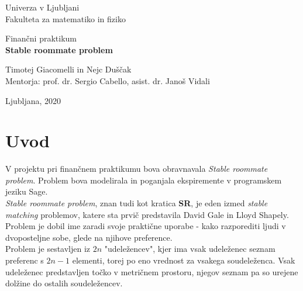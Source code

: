 \documentclass[12pt, a4paper]{article}
\begin{document}
\begin{titlepage}
\begin{center}

\large
Univerza v Ljubljani\\
\normalsize
Fakulteta za matematiko in fiziko\\

\vspace{5 cm} 

\large
Finančni praktikum \\


\vspace{0.5cm}
\LARGE
\textbf{Stable roommate problem}

\vspace{0.5 cm}

\large
Timotej Giacomelli in Nejc Duščak\\


\vspace{1.5cm}
\normalsize
Mentorja: prof. dr. Sergio Cabello, asist. dr. Janoš Vidali
\vspace{3cm}


\vfill

\large Ljubljana, 2020

\end{center}
\end{titlepage}


\newpage

\tableofcontents
\vspace{22mm}

\newpage

\section{Uvod}
V projektu pri finančnem praktikumu bova obravnavala \textit{Stable roommate problem}.  Problem bova modelirala in poganjala ekspiremente v programskem jeziku Sage.\\

\textit{Stable roommate problem}, znan tudi kot kratica \textbf{SR}, je eden izmed \textit{stable matching} problemov, katere sta prvič predstavila David Gale in Lloyd Shapely. Problem je dobil ime zaradi svoje praktične uporabe - kako razporediti ljudi v dvoposteljne sobe, glede na njihove preference.\\

Problem je sestavljen iz $2n$ "udeležencev", kjer ima vsak udeleženec seznam preferenc s $2n - 1$ elementi, torej po eno vrednost za vsakega soudeleženca. Vsak udeleženec predstavljen točko v metričnem prostoru, njegov seznam pa so urejene dolžine do ostalih soudeležencev.\\
\end{document}
